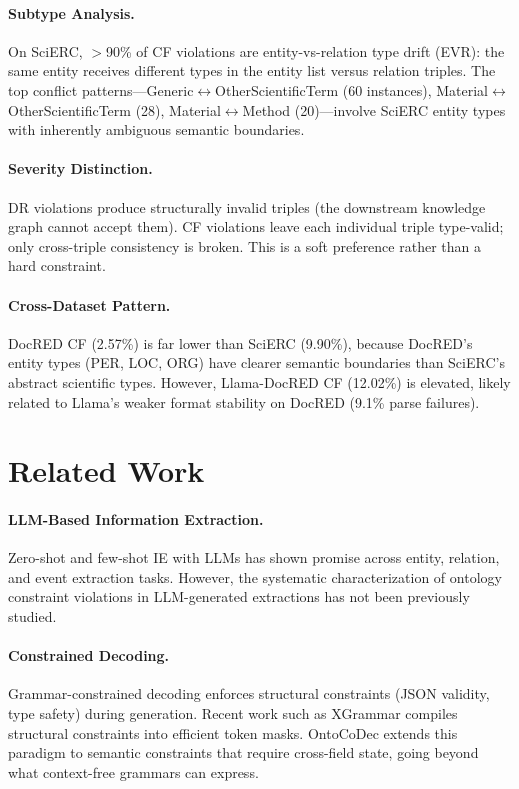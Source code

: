 \documentclass[11pt,a4paper]{article}
\newcommand{\sys}{OntoCoDec}
\begin{document}
\paragraph{Subtype Analysis.} On SciERC, $>$90\% of CF violations are entity-vs-relation type drift (EVR): the same entity receives different types in the entity list versus relation triples. The top conflict patterns---Generic$\leftrightarrow$OtherScientificTerm (60 instances), Material$\leftrightarrow$OtherScientificTerm (28), Material$\leftrightarrow$Method (20)---involve SciERC entity types with inherently ambiguous semantic boundaries.

\paragraph{Severity Distinction.} DR violations produce structurally invalid triples (the downstream knowledge graph cannot accept them). CF violations leave each individual triple type-valid; only cross-triple consistency is broken. This is a soft preference rather than a hard constraint.

\paragraph{Cross-Dataset Pattern.} DocRED CF (2.57\%) is far lower than SciERC (9.90\%), because DocRED's entity types (PER, LOC, ORG) have clearer semantic boundaries than SciERC's abstract scientific types. However, Llama-DocRED CF (12.02\%) is elevated, likely related to Llama's weaker format stability on DocRED (9.1\% parse failures).

\section{Related Work}
\label{sec:related}

\paragraph{LLM-Based Information Extraction.} Zero-shot and few-shot IE with LLMs has shown promise across entity, relation, and event extraction tasks. However, the systematic characterization of ontology constraint violations in LLM-generated extractions has not been previously studied.

\paragraph{Constrained Decoding.} Grammar-constrained decoding enforces structural constraints (JSON validity, type safety) during generation. Recent work such as XGrammar compiles structural constraints into efficient token masks. \sys{} extends this paradigm to semantic constraints that require cross-field state, going beyond what context-free grammars can express.
\end{document}
